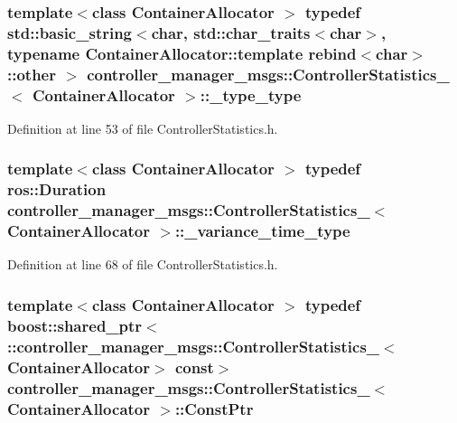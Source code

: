 \subsubsection[{\-\_\-type\-\_\-type}]{\setlength{\rightskip}{0pt plus 5cm}template$<$class Container\-Allocator $>$ typedef std\-::basic\-\_\-string$<$char, std\-::char\-\_\-traits$<$char$>$, typename \-Container\-Allocator\-::template rebind$<$char$>$\-::other $>$ {\bf controller\-\_\-manager\-\_\-msgs\-::\-Controller\-Statistics\-\_\-}$<$ \-Container\-Allocator $>$\-::{\bf \-\_\-type\-\_\-type}}\label{structcontroller__manager__msgs_1_1ControllerStatistics___a2dca16801bc900ba874c28b833f9e9dc}


\-Definition at line 53 of file \-Controller\-Statistics.\-h.

\subsubsection[{\-\_\-variance\-\_\-time\-\_\-type}]{\setlength{\rightskip}{0pt plus 5cm}template$<$class Container\-Allocator $>$ typedef ros\-::\-Duration {\bf controller\-\_\-manager\-\_\-msgs\-::\-Controller\-Statistics\-\_\-}$<$ \-Container\-Allocator $>$\-::{\bf \-\_\-variance\-\_\-time\-\_\-type}}\label{structcontroller__manager__msgs_1_1ControllerStatistics___afcfd2ce1beb04b87df6aca7ae82aa2a4}


\-Definition at line 68 of file \-Controller\-Statistics.\-h.

\subsubsection[{\-Const\-Ptr}]{\setlength{\rightskip}{0pt plus 5cm}template$<$class Container\-Allocator $>$ typedef boost\-::shared\-\_\-ptr$<$ \-::{\bf controller\-\_\-manager\-\_\-msgs\-::\-Controller\-Statistics\-\_\-}$<$\-Container\-Allocator$>$ const$>$ {\bf controller\-\_\-manager\-\_\-msgs\-::\-Controller\-Statistics\-\_\-}$<$ \-Container\-Allocator $>$\-::{\bf \-Const\-Ptr}}\label{structcontroller__manager__msgs_1_1ControllerStatistics___a34f02363d0d1d5431aa04e8708d525f6}


